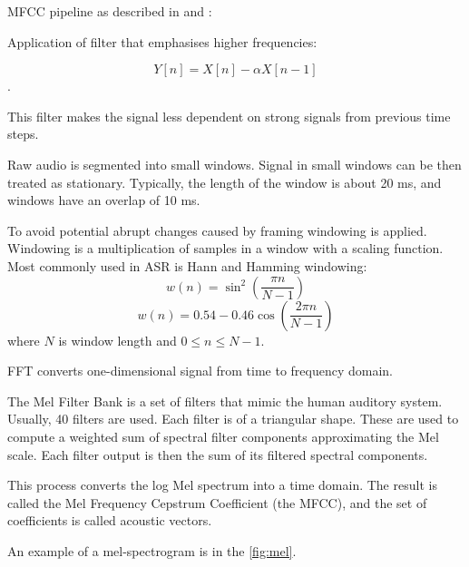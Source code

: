 MFCC pipeline as described in  and :

\begin{enumerate}
	 Application of filter that emphasises higher frequencies:
	
	\begin{equation}
	Y[n] = X[n] - \alpha X[n-1]
	\end{equation}.
	
	This filter makes the signal less dependent on strong signals from previous time steps.
	
	 Raw audio is segmented into small windows. Signal in small windows can be then treated as stationary. Typically, the length of the window is about 20 ms, and windows have an overlap of 10 ms.
	
	 To avoid potential abrupt changes caused by framing windowing is applied. Windowing is a multiplication of samples in a window with a scaling function. Most commonly used in ASR is Hann and Hamming windowing:
	\begin{equation}
	w(n) = \sin^2{\left( \frac{\pi n}{N - 1} \right)}
	\end{equation}
	\begin{equation}
	w(n) = 0.54 - 0.46 \cos{\left(\frac{2\pi n}{N - 1}\right)}
	\end{equation}
	where $N$ is window length and $0 \leq n \leq N - 1$.
	
	 FFT converts one-dimensional signal from time to frequency domain.
	
	The Mel Filter Bank is a set of filters that mimic the human auditory system. Usually, 40 filters are used. Each filter is of a triangular shape. These are used to compute a weighted sum of spectral filter components approximating the Mel scale.
	Each filter output is then the sum of its filtered spectral components. 
	
	 This process converts the log Mel spectrum into a time domain. The result is called the Mel Frequency Cepstrum Coefficient (the MFCC), and the set of coefficients is called acoustic vectors.
\end{enumerate}

An example of a mel-spectrogram is in the \cref{fig:mel}.

